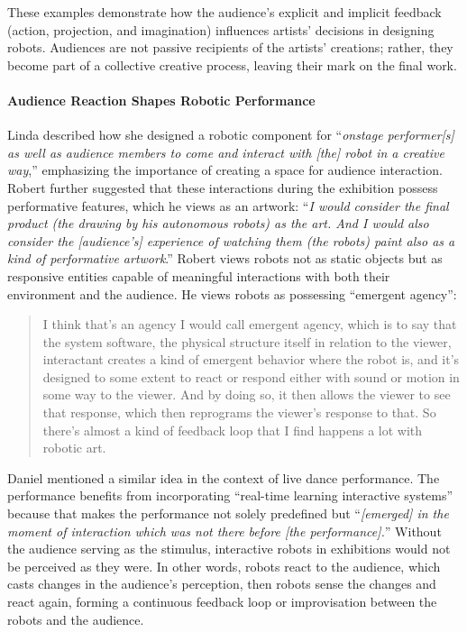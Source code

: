 These examples demonstrate how the audience's explicit and implicit feedback (action, projection, and imagination) influences artists’ decisions in designing robots. Audiences are not passive recipients of the artists’ creations; rather, they become part of a collective creative process, leaving their mark on the final work.

\paragraph{Audience Reaction Shapes Robotic Performance}
Linda described how she designed a robotic component for ``\textit{onstage performer[s] as well as audience members to come and interact with [the] robot in a creative way},'' emphasizing the importance of creating a space for audience interaction. Robert further suggested that these interactions during the exhibition possess performative features, which he views as an artwork: ``\textit{I would consider the final product (the drawing by his autonomous robots) as the art. And I would also consider the [audience's] experience of watching them (the robots) paint also as a kind of performative artwork}.'' Robert views robots not as static objects but as responsive entities capable of meaningful interactions with both their environment and the audience. He views robots as possessing ``emergent agency'':

\begin{quote}
    I think that's an agency I would call emergent agency, which is to say that the system software, the physical structure itself in relation to the viewer, interactant creates a kind of emergent behavior where the robot is, and it's designed to some extent to react or respond either with sound or motion in some way to the viewer. And by doing so, it then allows the viewer to see that response, which then reprograms the viewer's response to that. So there's almost a kind of feedback loop that I find happens a lot with robotic art.
\end{quote}

Daniel mentioned a similar idea in the context of live dance performance. The performance benefits from incorporating ``real-time learning interactive systems'' because that makes the performance not solely predefined but ``\textit{[emerged] in the moment of interaction which was not there before [the performance].}'' Without the audience serving as the stimulus, interactive robots in exhibitions would not be perceived as they were. In other words, robots react to the audience, which casts changes in the audience's perception, then robots sense the changes and react again, forming a continuous feedback loop or improvisation between the robots and the audience.

